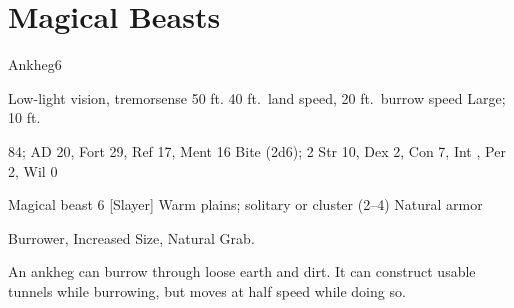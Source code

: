 \section{Magical Beasts}\label{Magical Beasts}

    \begin{monsection}{Ankheg}{6}
        \begin{spellcontent}
            \begin{spelltargetinginfo}
                \pari {} Low-light vision, tremorsense 50 ft.
                \pari {} 40 ft.\ land speed, 20 ft.\ burrow speed
                \pari {} Large;  10 ft.
            \end{spelltargetinginfo}
            \begin{spelleffects}
                \pari {} 84;  AD 20, Fort 29, Ref 17, Ment 16
                \pari {} Bite  (2d6);  2
                \pari {} Str 10, Dex 2, Con 7, Int , Per 2, Wil 0
            \end{spelleffects}
        \end{spellcontent}
        \begin{spellfooter}
            \pari {} Magical beast 6 [Slayer]
            \pari {} Warm plains; solitary or cluster (2--4)
            \pari {} Natural armor 
        \end{spellfooter}
    \end{monsection}
     Burrower, Increased Size, Natural Grab.

     An ankheg can burrow through loose earth and dirt.
    It can construct usable tunnels while burrowing, but moves at half speed while doing so.

